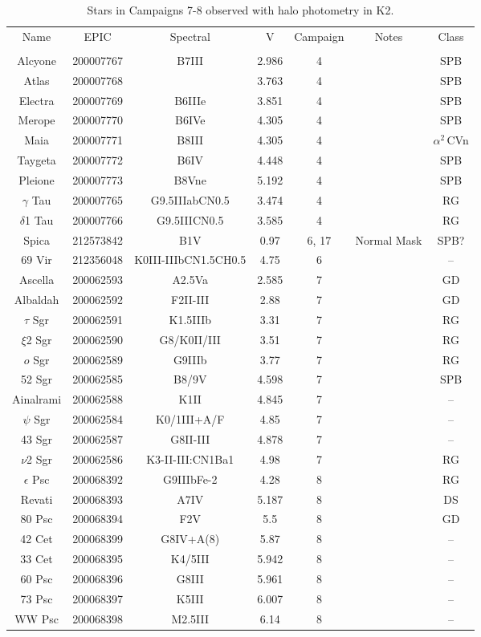 \begin{table*}
\caption{Stars in Campaigns 7-8 observed with halo photometry in K2.\label{table_0}}
\begin{tabular}{ccccccc}
\hline \hline
Name & EPIC & Spectral & V & Campaign & Notes & Class \\
 &  &  &  &  &  &  \\
\hline
Alcyone & 200007767 & B7III & 2.986 & 4 & \tablenotemark{a} & SPB \\
Atlas & 200007768 &  & 3.763 & 4 & \tablenotemark{a} & SPB \\
Electra & 200007769 & B6IIIe & 3.851 & 4 & \tablenotemark{a} & SPB \\
Merope & 200007770 & B6IVe & 4.305 & 4 & \tablenotemark{a} & SPB \\
Maia & 200007771 & B8III & 4.305 & 4 & \tablenotemark{a} & $\alpha^2$\,CVn \\
Taygeta & 200007772 & B6IV & 4.448 & 4 & \tablenotemark{a} & SPB \\
Pleione & 200007773 & B8Vne & 5.192 & 4 & \tablenotemark{a} & SPB \\
$\gamma$ Tau & 200007765 & G9.5IIIabCN0.5 & 3.474 & 4 &  & RG \\
$\delta$1 Tau & 200007766 & G9.5IIICN0.5 & 3.585 & 4 &  & RG \\
Spica & 212573842 & B1V & 0.97 & 6, 17 & Normal Mask & SPB? \\
69 Vir & 212356048 & K0III-IIIbCN1.5CH0.5 & 4.75 & 6 &  & -- \\
Ascella & 200062593 & A2.5Va & 2.585 & 7 &  & GD \\
Albaldah & 200062592 & F2II-III & 2.88 & 7 &  & GD \\
$\tau$ Sgr & 200062591 & K1.5IIIb & 3.31 & 7 &  & RG \\
$\xi$2 Sgr & 200062590 & G8/K0II/III & 3.51 & 7 &  & RG \\
$o$ Sgr & 200062589 & G9IIIb & 3.77 & 7 &  & RG \\
52 Sgr & 200062585 & B8/9V & 4.598 & 7 &  & SPB \\
Ainalrami & 200062588 & K1II & 4.845 & 7 &  & -- \\
$\psi$ Sgr & 200062584 & K0/1III+A/F & 4.85 & 7 &  & -- \\
43 Sgr & 200062587 & G8II-III & 4.878 & 7 &  & -- \\
$\nu$2 Sgr & 200062586 & K3-II-III:CN1Ba1 & 4.98 & 7 &  & RG \\
$\epsilon$ Psc & 200068392 & G9IIIbFe-2 & 4.28 & 8 &  & RG \\
Revati & 200068393 & A7IV & 5.187 & 8 &  & DS \\
80 Psc & 200068394 & F2V & 5.5 & 8 &  & GD \\
42 Cet & 200068399 & G8IV+A(8) & 5.87 & 8 &  & -- \\
33 Cet & 200068395 & K4/5III & 5.942 & 8 &  & -- \\
60 Psc & 200068396 & G8III & 5.961 & 8 &  & -- \\
73 Psc & 200068397 & K5III & 6.007 & 8 &  & -- \\
WW Psc & 200068398 & M2.5III & 6.14 & 8 &  & -- \\
\hline
\end{tabular}
\end{table*}
